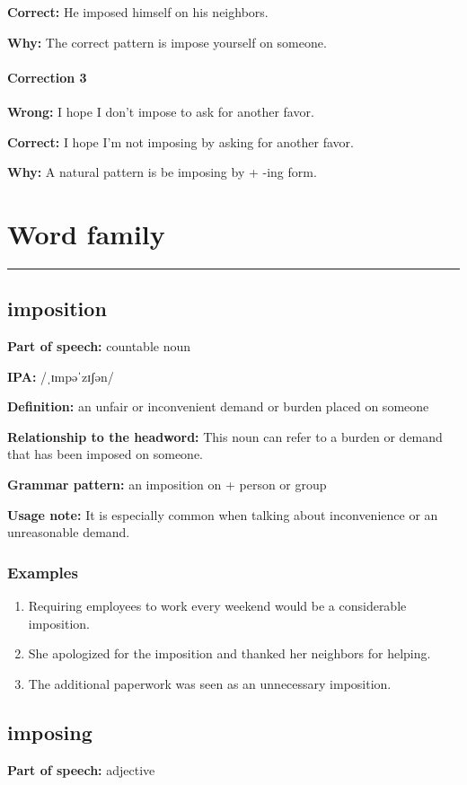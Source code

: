 \documentclass[11pt]{article}
\newcommand{\sectionrule}{\par\vspace{-0.5em}\noindent\textcolor{Accent}{\rule{\linewidth}{0.6pt}}\par}
\begin{document}
\textbf{Correct:} He imposed himself on his neighbors.

\textbf{Why:} The correct pattern is impose yourself on someone.

\paragraph{Correction 3}
\textbf{Wrong:} I hope I don't impose to ask for another favor.

\textbf{Correct:} I hope I'm not imposing by asking for another favor.

\textbf{Why:} A natural pattern is be imposing by + -ing form.

\section{Word family}
\sectionrule
\subsection{imposition}
\textbf{Part of speech:} countable noun

\textbf{IPA:} /ˌɪmpəˈzɪʃən/

\textbf{Definition:} an unfair or inconvenient demand or burden placed on someone

\textbf{Relationship to the headword:} This noun can refer to a burden or demand that has been imposed on someone.

\textbf{Grammar pattern:} an imposition on + person or group

\textbf{Usage note:} It is especially common when talking about inconvenience or an unreasonable demand.

\subsubsection{Examples}
\begin{enumerate}
  \item Requiring employees to work every weekend would be a considerable imposition.
  \item She apologized for the imposition and thanked her neighbors for helping.
  \item The additional paperwork was seen as an unnecessary imposition.
\end{enumerate}

\subsection{imposing}
\textbf{Part of speech:} adjective
\end{document}
